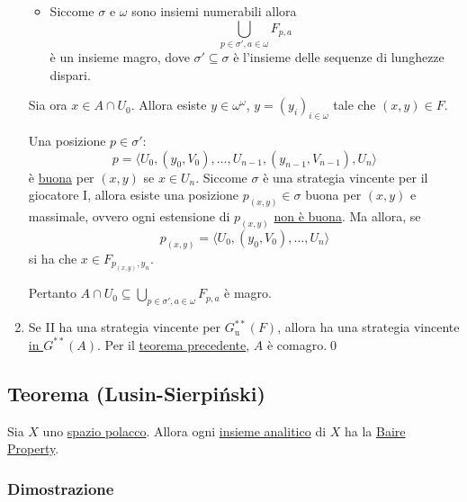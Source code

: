 \documentclass{article}
\newcommand{\1}{\mathds{1}}
\begin{document}
\begin{enumerate}
\begin{itemize}
\item Siccome \(\sigma\) e \(\omega\) sono insiemi numerabili allora
\begin{equation*}
   \bigcup_{p \in \sigma', a \in \omega} F_{p,a}
\end{equation*}
è un insieme magro, dove \(\sigma' \subseteq \sigma\) è l'insieme delle sequenze di lunghezze dispari.
\end{itemize}

Sia ora \(x \in A\cap U_{0}\). Allora esiste \(y \in \omega^{\omega}\), \(y=(y_{i})_{i \in\omega}\) tale che \((x,y) \in F\).

Una posizione \(p \in \sigma'\):
\begin{equation*}
     p=\langle
     	U_{0},({y}_{0}, V_{0}), \dots, U_{n-1}, ({y}_{n-1}, V_{n-1}), U_{n}
     \rangle
\end{equation*}
è \uline{buona} per \((x,{y})\) se \(x \in U_{n}\). Siccome \(\sigma\) è una strategia vincente per il giocatore I, allora esiste una posizione \(p_{(x,y)} \in \sigma\) buona per \((x,y)\) e massimale, ovvero ogni estensione di \(p_{(x,y)}\) \uline{non è buona}. Ma allora, se
\begin{equation*}
 p_{(x,y)} = \langle U_{0}, (y_{0},V_{0}),\dots, U_{n}\rangle
\end{equation*}
si ha che \(x \in F_{p_{(x,y)}, y_{n}}\).

Pertanto \(A\cap U_{0} \subseteq \bigcup_{p \in \sigma', a \in \omega} F_{p,a}\) è magro.

\item Se II ha una strategia vincente per \(G^{**}_{\text{u}}(F)\), allora ha una strategia vincente \hyperref[sec:orge8e0b9e]{in \(G^{**}(A)\)}. Per il \href{../../../../../../../org/roam/20250514174717-teorema_di_caratterizzazione_dei_comagri_tramite_il_gioco_di_banach_mazur.org}{teorema precedente}, \(A\) è comagro.\qed
\end{enumerate}
\subsection{Teorema (Lusin-Sierpiński)}
\label{sec:org65a9bfc}

Sia \(X\) uno \href{../../../../../../../org/roam/20250301194013-spazio_polacco.org}{spazio polacco}. Allora ogni \href{../../../../../../../org/roam/20250525220742-insieme_analitico.org}{insieme analitico} di \(X\) ha la \href{../../../../../../../org/roam/20250514154039-proprieta_di_baire.org}{Baire Property}.
\subsubsection{Dimostrazione}
\label{sec:orge50bb88}
\end{document}
